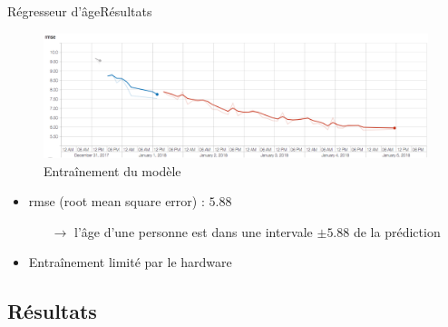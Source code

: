 \documentclass[compress]{beamer}
\begin{document}
\begin{frame}{Régresseur d'âge}{Résultats}
    \begin{figure}
      \includegraphics[width=\linewidth]{resources/age-reg}
      \caption{Entraînement du modèle}
    \end{figure}
    \vspace{-.05\linewidth}
\begin{itemize}
  \item rmse (root mean square error) : $5.88$
  \begin{itemize}
    \item[$\rightarrow$] l'âge d'une personne est dans une intervale $\pm 5.88$ de la prédiction
  \end{itemize}
    \item Entraînement limité par le hardware
\end{itemize}
\end{frame}

\subsection{Résultats}
\end{document}
